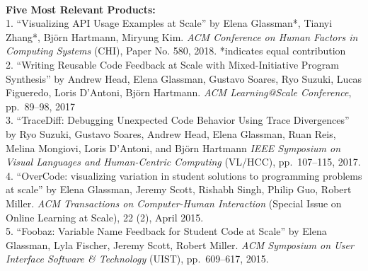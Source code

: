 \documentclass[11pt]{article}
\begin{document}
      
\\
{\bf Five Most Relevant Products:}\\
1. ``Visualizing API Usage Examples at Scale'' by Elena Glassman*, Tianyi Zhang*, Bj\"orn Hartmann, Miryung Kim. \emph{ACM Conference on Human Factors in Computing Systems} (CHI), Paper No. 580, 2018. *indicates equal contribution\\[2pt]
2. ``Writing Reusable Code Feedback at Scale with Mixed-Initiative Program Synthesis'' by
Andrew Head, Elena Glassman, Gustavo Soares, Ryo Suzuki, Lucas Figueredo, Loris D'Antoni, Bj\"orn Hartmann. {\em ACM Learning@Scale Conference}, pp.~89--98, 2017\\[2pt]
3. ``TraceDiff: Debugging Unexpected Code Behavior Using Trace Divergences'' by Ryo Suzuki, Gustavo Soares, Andrew Head, Elena Glassman, Ruan Reis, Melina Mongiovi, Loris D'Antoni, and Bj\"orn Hartmann \emph{IEEE Symposium on Visual Languages and Human-Centric Computing} (VL/HCC), pp.~107--115, 2017.\\[2pt]
4. ``OverCode: visualizing variation in student solutions to programming problems at scale'' by Elena Glassman, Jeremy Scott, Rishabh Singh, Philip Guo, Robert Miller. \emph{ACM Transactions on Computer-Human Interaction} ({\small Special Issue on Online Learning at Scale}), 22 (2), April 2015.\\[2pt]
5. ``Foobaz: Variable Name Feedback for Student Code at Scale'' by Elena Glassman, Lyla Fischer, Jeremy Scott, Robert Miller. \emph{ACM Symposium on User Interface Software \& Technology} (UIST), pp.~609--617, 2015.\\[2pt]
\end{document}
